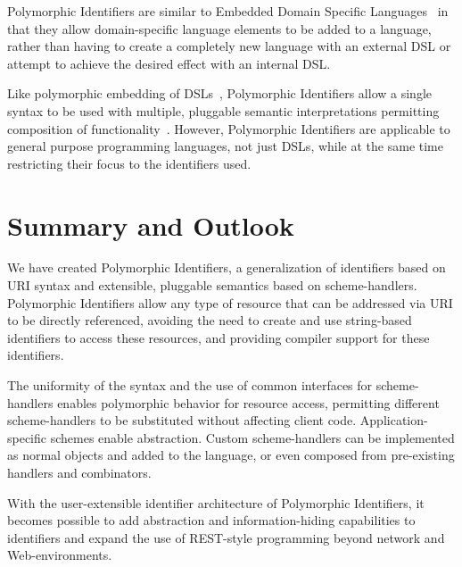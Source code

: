 \documentclass[preprint]{sigplanconf}
\begin{document}
Polymorphic Identifiers are similar to Embedded Domain Specific Languages~\cite{edsl}
in that they allow domain-specific language elements to be added to a language, rather
than having to create a completely new language with an external DSL or attempt to 
achieve the desired effect with an internal DSL\cite{fowlerdsl}.  

Like polymorphic embedding of DSLs~\cite{polydsl}, Polymorphic Identifiers allow
a single syntax to be used with multiple, pluggable semantic interpretations permitting
composition of functionality~\cite{embeddeddsl}.  However, Polymorphic Identifiers
are applicable to general purpose programming languages, not just DSLs, while
at the same time restricting their focus to the identifiers used.





\section{Summary and Outlook}
\label{summary-and-outlook}

We have created Polymorphic Identifiers, a generalization of identifiers based on URI
syntax and extensible, pluggable semantics based on scheme-handlers.   
Polymorphic Identifiers allow any type of resource that can be addressed via URI
to be directly referenced, avoiding the need to create and use string-based identifiers 
to access these resources, and providing compiler support for these identifiers.

The uniformity of the syntax and the use of common interfaces for scheme-handlers
enables polymorphic behavior for resource access, permitting different scheme-handlers
to be substituted without affecting client code. Application-specific schemes
enable abstraction.
Custom scheme-handlers can be implemented as normal objects and added
to the language, or even composed from pre-existing handlers and
combinators.

With the user-extensible identifier architecture of Polymorphic Identifiers, it becomes possible to add abstraction
and information-hiding capabilities to identifiers and expand the use of REST-style
programming beyond network and Web-environments.



\end{document}
